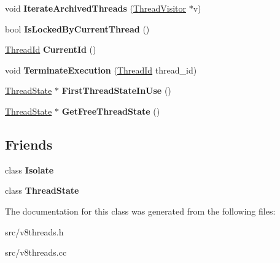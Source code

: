 \begin{DoxyCompactItemize}
\item 
\hypertarget{classv8_1_1internal_1_1_thread_manager_a2fec67e06e5fc2f061ac8f87bb2bb080}{}void {\bfseries Iterate\+Archived\+Threads} (\hyperlink{classv8_1_1internal_1_1_thread_visitor}{Thread\+Visitor} $\ast$v)\label{classv8_1_1internal_1_1_thread_manager_a2fec67e06e5fc2f061ac8f87bb2bb080}

\item 
\hypertarget{classv8_1_1internal_1_1_thread_manager_a76827c7de3e7dcba0f6729ad3657a265}{}bool {\bfseries Is\+Locked\+By\+Current\+Thread} ()\label{classv8_1_1internal_1_1_thread_manager_a76827c7de3e7dcba0f6729ad3657a265}

\item 
\hypertarget{classv8_1_1internal_1_1_thread_manager_a20de7ca0770f36132c2f48462ff07e08}{}\hyperlink{classv8_1_1internal_1_1_thread_id}{Thread\+Id} {\bfseries Current\+Id} ()\label{classv8_1_1internal_1_1_thread_manager_a20de7ca0770f36132c2f48462ff07e08}

\item 
\hypertarget{classv8_1_1internal_1_1_thread_manager_a727811d1054cd52d32130897f5362a13}{}void {\bfseries Terminate\+Execution} (\hyperlink{classv8_1_1internal_1_1_thread_id}{Thread\+Id} thread\+\_\+id)\label{classv8_1_1internal_1_1_thread_manager_a727811d1054cd52d32130897f5362a13}

\item 
\hypertarget{classv8_1_1internal_1_1_thread_manager_a31381c48c7f8608f4a2ab582a2c4c729}{}\hyperlink{classv8_1_1internal_1_1_thread_state}{Thread\+State} $\ast$ {\bfseries First\+Thread\+State\+In\+Use} ()\label{classv8_1_1internal_1_1_thread_manager_a31381c48c7f8608f4a2ab582a2c4c729}

\item 
\hypertarget{classv8_1_1internal_1_1_thread_manager_ae7610d3c55e69ceffd65c6b734813f0b}{}\hyperlink{classv8_1_1internal_1_1_thread_state}{Thread\+State} $\ast$ {\bfseries Get\+Free\+Thread\+State} ()\label{classv8_1_1internal_1_1_thread_manager_ae7610d3c55e69ceffd65c6b734813f0b}

\end{DoxyCompactItemize}
\subsection*{Friends}
\begin{DoxyCompactItemize}
\item 
\hypertarget{classv8_1_1internal_1_1_thread_manager_aba4f0964bdacf2bbf62cf876e5d28d0a}{}class {\bfseries Isolate}\label{classv8_1_1internal_1_1_thread_manager_aba4f0964bdacf2bbf62cf876e5d28d0a}

\item 
\hypertarget{classv8_1_1internal_1_1_thread_manager_aa9bf73e11f97e69db675bb6d4c212a2a}{}class {\bfseries Thread\+State}\label{classv8_1_1internal_1_1_thread_manager_aa9bf73e11f97e69db675bb6d4c212a2a}

\end{DoxyCompactItemize}


The documentation for this class was generated from the following files\+:\begin{DoxyCompactItemize}
\item 
src/v8threads.\+h\item 
src/v8threads.\+cc\end{DoxyCompactItemize}
